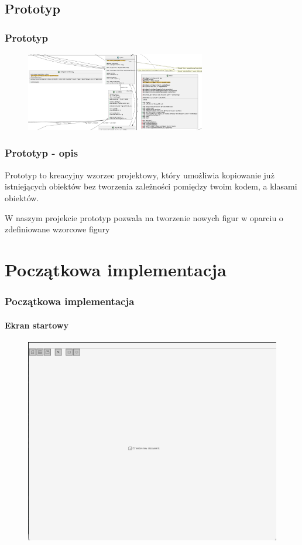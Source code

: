 \documentclass[
	11pt,]{beamer}
\begin{document}
\subsection{Prototyp}

\begin{frame}
	\frametitle{Prototyp}
	\begin{figure}
		\includegraphics[width=0.7\textwidth]{figures/prototyp.pdf}
	\end{figure}
\end{frame}

\begin{frame}
	\frametitle{Prototyp - opis}
	Prototyp to kreacyjny wzorzec projektowy, który umożliwia kopiowanie już istniejących obiektów bez tworzenia zależności pomiędzy twoim kodem, a klasami obiektów.
	
	\vfill
	
	W naszym projekcie prototyp pozwala na tworzenie nowych figur w oparciu o zdefiniowane wzorcowe figury
\end{frame}


\section{Początkowa implementacja}

\begin{frame}
	\frametitle{Początkowa implementacja}
	\framesubtitle{Ekran startowy}
	
	\begin{figure}
		\includegraphics[height=0.7\textheight]{figures/pro1.png}
	\end{figure}
\end{frame}
\end{document}
